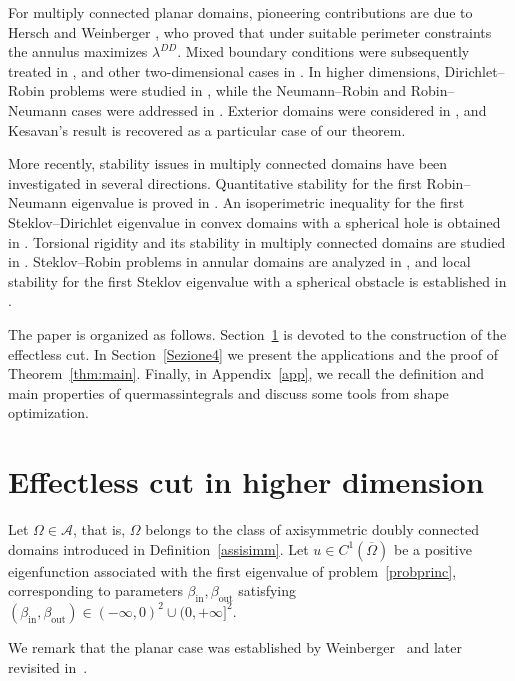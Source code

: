 \documentclass[oneside,a4paper,11pt,notitlepage]{article}
\newcommand{\Simm}{\mathcal A}
\newcommand{\betaposneg}{(-\infty,0)^2\cup(0, +\infty]^2}
\theoremstyle{plain}
\numberwithin{teor}{section}
\numberwithin{equation}{section}
\theoremstyle{definition}
\theoremstyle{plain}
\theoremstyle{plain}
\theoremstyle{plain}
\theoremstyle{plain}
\theoremstyle{definition}
\theoremstyle{definition}
\theoremstyle{plain}
\begin{document}
For multiply connected planar domains, pioneering contributions are due to Hersch and Weinberger \cite{hersch,Weinberger}, who proved that under suitable perimeter constraints the annulus maximizes $\lambda^{DD}$. Mixed boundary conditions were subsequently treated in \cite{herschDN,Weinberger}, and other two-dimensional cases in \cite{anoop}. In higher dimensions, Dirichlet–Robin problems were studied in \cite{gavitonepiscitelli}, while the Neumann–Robin and Robin–Neumann cases were addressed in \cite{DPP,Paoli_Piscitelli_Trani}. Exterior domains were considered in \cite{Krejloto1}, and Kesavan’s result \cite{kesavan} is recovered as a particular case of our theorem.

More recently, stability issues in multiply connected domains have been investigated in several directions. Quantitative stability for the first Robin–Neumann eigenvalue is proved in \cite{CPP}. An isoperimetric inequality for the first Steklov–Dirichlet eigenvalue in convex domains with a spherical hole is obtained in \cite{GPPS}. Torsional rigidity and its stability in multiply connected domains are studied in \cite{AB,B}. Steklov–Robin problems in annular domains are analyzed in \cite{GS2}, and local stability for the first Steklov eigenvalue with a spherical obstacle is established in \cite{PPS}.

\medskip

The paper is organized as follows. Section~\ref{Sezione3} is devoted to the construction of the effectless cut. In Section~\ref{Sezione4} we present the applications and the proof of Theorem~\ref{thm:main}. Finally, in Appendix~\ref{app}, we recall the definition and main properties of quermassintegrals and discuss some tools from shape optimization.

\section{Effectless cut in higher dimension}\label{Sezione3}
Let $\Omega \in \Simm$, that is, $\Omega$ belongs to the class of axisymmetric
doubly connected domains introduced in Definition~\ref{assisimm}. Let
$u \in C^{1}(\overline{\Omega})$ be a positive eigenfunction associated with
the first eigenvalue of problem~\eqref{probprinc}, corresponding to parameters
$\beta_{\mathrm{in}}, \beta_{\mathrm{out}}$ satisfying $(\beta_{\mathrm{in}}, \beta_{\mathrm{out}}) \in \betaposneg.$


We remark that the planar case was established by Weinberger~\cite{Weinberger} and later revisited in~\cite{anoop}.
\end{document}
